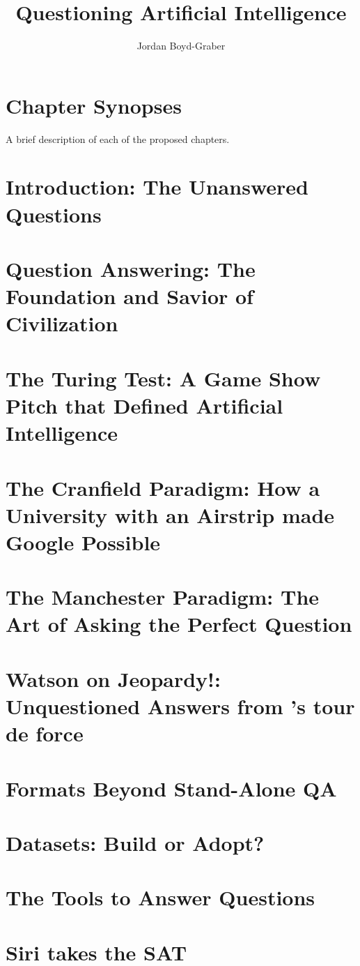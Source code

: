 \documentclass[bfivepaper,twosided,justified,nobib]{style/tufte-book}
\title{Questioning Artificial Intelligence}
\author{Jordan Boyd-Graber}
\newif\ifproposal\proposaltrue
\newcommand{\proposalpart}[2]{
  \ifproposal
  \else
  \part{#1}
  \fi
}
\newcommand{\chapterfile}[3]{
  \ifproposal
      \begingroup
      \renewcommand{\cleardoublepage}{}
      \renewcommand{\clearpage}{}
      \chapter{#3}\label{ch:#2}
      \endgroup
      \vspace{-0.5cm}
      
      \vspace{-2.5cm}
  \else
      \chapter{#3}
      \label{ch:#2}
      \begin{quote}
        
      \end{quote} 
      
  \fi}
\begin{document}
\setcounter{secnumdepth}{1}







\clearpage
\ifproposal

  \chapter{Chapter Synopses}

  \setcounter{chapter}{0}

  \titleformat{\chapter}[display]
  {\normalfont%
      \normalsize %
      \bfseries}{}{20pt}{%
      \normalsize \thechapter: %
      }
  
  A brief description of each of the proposed chapters.
  \else
  
\fi


\chapterfile{010}{introduction}{Introduction: The Unanswered Questions}

\proposalpart{Question Answering Before Computers}{1}

\chapterfile{110}{history}{Question Answering: The Foundation and Savior of Civilization}


\chapterfile{120}{turing}{The Turing Test: A Game Show Pitch that
  Defined Artificial Intelligence}

\chapterfile{130}{ir}{The Cranfield Paradigm: How a University with an Airstrip made Google Possible}

\chapterfile{140}{manchester}{The Manchester Paradigm: The Art of Asking the Perfect Question}


  \proposalpart{Question Answering Present}{2}

  \chapterfile{200}{watson}{Watson on Jeopardy!: \\ Unquestioned Answers from \abr{ibm}'s tour de force}

  \chapterfile{210}{formats}{Formats Beyond Stand-Alone QA}

\chapterfile{220}{datasets}{Datasets: Build or Adopt?}    

\chapterfile{230}{methods}{The Tools to Answer Questions}


\chapterfile{240}{leaderboards}{Siri takes the SAT}
\end{document}
